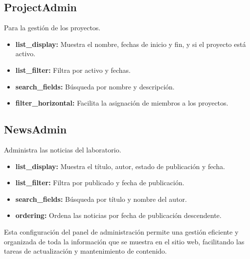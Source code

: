 \subsection{ProjectAdmin}
Para la gestión de los proyectos.
\begin{itemize}
    \item \textbf{list\_display:} Muestra el nombre, fechas de inicio y fin, y si el proyecto está activo.
    \item \textbf{list\_filter:} Filtra por activo y fechas.
    \item \textbf{search\_fields:} Búsqueda por nombre y descripción.
    \item \textbf{filter\_horizontal:} Facilita la asignación de miembros a los proyectos.
\end{itemize}

\subsection{NewsAdmin}
Administra las noticias del laboratorio.
\begin{itemize}
    \item \textbf{list\_display:} Muestra el título, autor, estado de publicación y fecha.
    \item \textbf{list\_filter:} Filtra por publicado y fecha de publicación.
    \item \textbf{search\_fields:} Búsqueda por título y nombre del autor.
    \item \textbf{ordering:} Ordena las noticias por fecha de publicación descendente.
\end{itemize}

Esta configuración del panel de administración permite una gestión eficiente y organizada de toda la información que se muestra en el sitio web, facilitando las tareas de actualización y mantenimiento de contenido.